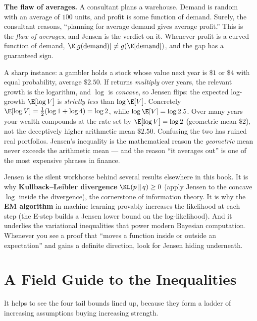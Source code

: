 \begin{paradoxbox}
\textbf{The flaw of averages.} A consultant plans a warehouse. Demand is
random with an average of $100$ units, and profit is some function of demand.
Surely, the consultant reasons, ``planning for average demand gives average
profit.'' This is the \emph{flaw of averages}, and Jensen is the verdict on
it. Whenever profit is a curved function of demand, $\E[g(\text{demand})] \ne
g(\E[\text{demand}])$, and the gap has a guaranteed sign.

A sharp instance: a gambler holds a stock whose value next year is $\$1$ or
$\$4$ with equal probability, average $\$2.50$. If returns \emph{multiply}
over years, the relevant growth is the logarithm, and $\log$ is
\emph{concave}, so Jensen flips: the expected log-growth $\E[\log V]$ is
\emph{strictly less} than $\log \E[V]$. Concretely $\E[\log V] = \tfrac12(\log
1 + \log 4) = \log 2$, while $\log \E[V] = \log 2.5$. Over many years your
wealth compounds at the rate set by $\E[\log V] = \log 2$ (geometric mean
$\$2$), not the deceptively higher arithmetic mean $\$2.50$. Confusing the two
has ruined real portfolios. Jensen's inequality is the mathematical reason the
\emph{geometric} mean never exceeds the arithmetic mean --- and the reason
``it averages out'' is one of the most expensive phrases in finance.
\end{paradoxbox}

\begin{connectionbox}
Jensen is the silent workhorse behind several results elsewhere in this book.
It is why \textbf{Kullback--Leibler divergence} $\KL(p\,\|\,q) \ge 0$ (apply
Jensen to the concave $\log$ inside the divergence), the cornerstone of
information theory. It is why the \textbf{EM algorithm} in machine learning
provably increases the likelihood at each step (the E-step builds a Jensen
lower bound on the log-likelihood). And it underlies the variational
inequalities that power modern Bayesian computation. Whenever you see a proof
that ``moves a function inside or outside an expectation'' and gains a definite
direction, look for Jensen hiding underneath.
\end{connectionbox}

\section{A Field Guide to the Inequalities}
\label{ch19:fieldguide}

It helps to see the four tail bounds lined up, because they form a ladder of
increasing assumptions buying increasing strength.

